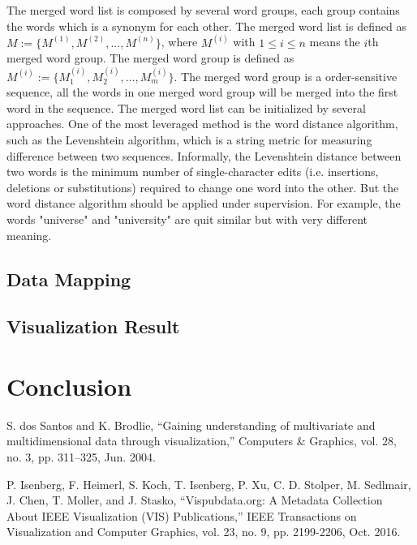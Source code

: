 \documentclass[10pt, conference, compsocconf]{IEEEtran}
\begin{document}
The merged word list is composed by several word groups, each group contains the words which is a synonym for each other. The merged word list is defined as $ M := \{ M^{(1)}, M^{(2)},...,M^{(n)} \} $, where $M^{(i)}$ with $1 \leq i \leq n$ means the $i$th merged word group. The merged word group is defined as $M^{(i)} := \{ M_1^{(i)},M_2^{(i)},...,M_m^{(i)}\}$. The merged word group is a order-sensitive sequence, all the words in one merged word group will be merged into the first word in the sequence. The merged word list can be initialized by several approaches. One of the most leveraged method is the word distance algorithm, such as the Levenshtein algorithm, which is a string metric for measuring difference between two sequences. Informally, the Levenshtein distance between two words is the minimum number of single-character edits (i.e. insertions, deletions or substitutions) required to change one word into the other. But the word distance algorithm should be applied under supervision. For example, the words "universe" and "university" are quit similar but with very different meaning.





\subsection{Data Mapping}

\subsection{Visualization Result}

\section{Conclusion}



\begin{thebibliography}{1}

S. dos Santos and K. Brodlie, “Gaining understanding of multivariate and multidimensional data through visualization,” Computers \& Graphics, vol. 28, no. 3, pp. 311–325, Jun. 2004.

P. Isenberg, F. Heimerl, S. Koch, T. Isenberg, P. Xu, C. D. Stolper, M. Sedlmair, J. Chen, T. Moller, and J. Stasko, “Vispubdata.org: A Metadata Collection About IEEE Visualization (VIS) Publications,” IEEE Transactions on Visualization and Computer Graphics, vol. 23, no. 9, pp. 2199-2206, Oct. 2016.

\end{thebibliography}
\end{document}
